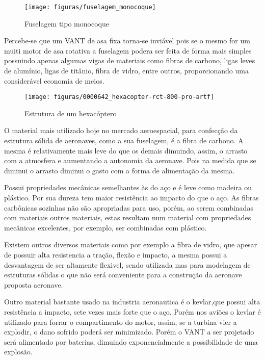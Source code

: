 \begin{figure}[H]
\centering\texttt{[image: figuras/fuselagem\_monocoque]}
\caption{Fuselagem tipo monocoque}
\end{figure}

Percebe-se que  um VANT de asa fixa torna-se inviável pois se o mesmo for um muiti motor de asa rotativa a fuselagem podera ser feita  de forma mais simples possuindo  apenas algumas vigas de  materiais como fibras de carbono,  ligas leves de alumínio, ligas de titânio, fibra de vidro, entre outros, proporcionando uma considerável economia de meios.\cite{rodrigues}

\begin{figure}[H]
\centering\texttt{[image: figuras/0000642\_hexacopter-rct-800-pro-artf]}
\caption{Estrutura de um hexacóptero}
\end{figure}

O material mais utilizado hoje no mercado aeroespacial, para confecção da estrutura sólida de aeronaves, como a sua fuselagem, é a fibra de carbono. \cite{fibracarbono2014} A mesma é relativamente mais leve do que os demais dimuindo, assim, o arrasto com a atmosfera e aumentando a autonomia da aeronave. Pois na medida que se diminui o arrasto diminui o gasto com a forma de alimentação da mesma.

Possui propriedades mecânicas semelhantes às do aço e é leve como madeira ou plástico. Por sua dureza tem maior resistência ao impacto do que o aço. As fibras carbônicas sozinhas não são apropriadas para uso, porém, ao serem combinadas com materiais outros materiais, estas resultam num material com propriedades mecânicas excelentes, por exemplo, ser combinadas com plástico.

Existem outros diversos materiais como por exemplo a fibra de vidro, que apesar de possuir alta resistencia a tração, flexão e impacto, a mesma possui a desvantagem de ser altamente flexivel, sendo utilizada mas para modelagem de estruturas sólidas o que não será conveniente para a construção da aeronave proposta  aeronave.

Outro material bastante usado na industria aeronautica é o kevlar,que possui alta resistência a impacto, sete vezes mais forte que o aço. Porém nos aviões o kevlar é utilizado para forrar o compartimento do motor, assim, se a turbina vier a explodir, o dano sofrido poderá ser minimizado. Porém o VANT a ser projetado será alimentado por baterias, dimuindo  exponencialmente a possibilidade de uma explosão.

